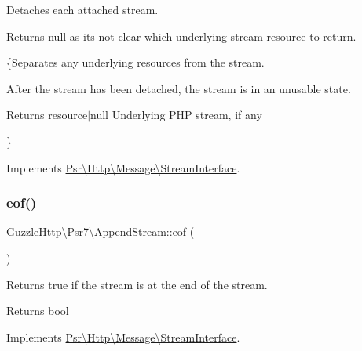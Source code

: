 Detaches each attached stream.

Returns null as it\textquotesingle{}s not clear which underlying stream resource to return.

\{Separates any underlying resources from the stream.

After the stream has been detached, the stream is in an unusable state.

\begin{DoxyReturn}{Returns}
resource$\vert$null Underlying P\+HP stream, if any
\end{DoxyReturn}
\} 

Implements \hyperlink{interfacePsr_1_1Http_1_1Message_1_1StreamInterface_a1670dba880a8c14690746732960d4c9c}{Psr\textbackslash{}\+Http\textbackslash{}\+Message\textbackslash{}\+Stream\+Interface}.

\mbox{\label{classGuzzleHttp_1_1Psr7_1_1AppendStream_a926c579f7f50d37b6f48b56d039437a5}} 
\subsubsection{\texorpdfstring{eof()}{eof()}}
{\footnotesize\ttfamily Guzzle\+Http\textbackslash{}\+Psr7\textbackslash{}\+Append\+Stream\+::eof (\begin{DoxyParamCaption}{ }\end{DoxyParamCaption})}

Returns true if the stream is at the end of the stream.

\begin{DoxyReturn}{Returns}
bool 
\end{DoxyReturn}


Implements \hyperlink{interfacePsr_1_1Http_1_1Message_1_1StreamInterface_a502cc5ca370c6925b78d95d86d68777c}{Psr\textbackslash{}\+Http\textbackslash{}\+Message\textbackslash{}\+Stream\+Interface}.

\mbox{\label{classGuzzleHttp_1_1Psr7_1_1AppendStream_aee1628457e8ca34d11792dbc20de1ac0}} 
